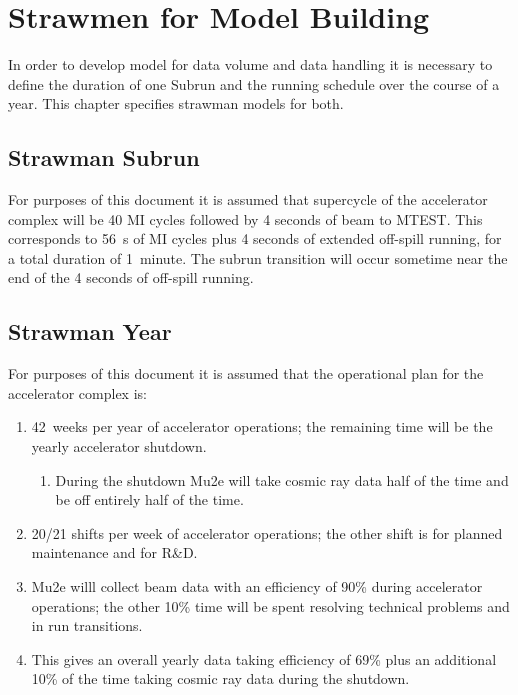 \chapter{Strawmen for Model Building}
\label{ch:strawmen}

In order to develop model for data volume and data handling it is necessary
to define the duration of one Subrun and the running schedule over the course
of a year.  This chapter specifies strawman models for both.

\section{Strawman Subrun}
\label{sec:strawmanSubrun}

For purposes of this document it is assumed that supercycle of the accelerator
complex will be 40 MI cycles followed by 4 seconds of beam to MTEST.  This
corresponds to 56~s of MI cycles plus 4 seconds of extended off-spill running,
for a total duration of 1~minute.  The subrun transition will occur sometime
near the end of the 4 seconds of off-spill running.

\section{Strawman Year}
\label{sec:strawmanYear}

For purposes of this document it is assumed that the operational plan for
the accelerator complex is:
\begin{enumerate}
  \item 42~weeks per year of accelerator operations; the remaining time will be the yearly accelerator shutdown.
    \begin{enumerate}
    \item During the shutdown Mu2e will take cosmic ray data half of the time and be off entirely half of the time.
    \end{enumerate}
  \item 20/21 shifts per week of accelerator operations; the other shift is for planned maintenance and for R\&D.
  \item Mu2e willl collect beam data with an efficiency of 90\% during accelerator operations;
    the other 10\% time will be spent resolving technical problems and in run transitions.
  \item This gives an overall yearly data taking efficiency of 69\% plus an additional 10\% of the time taking
    cosmic ray data during the shutdown.
\end{enumerate}


